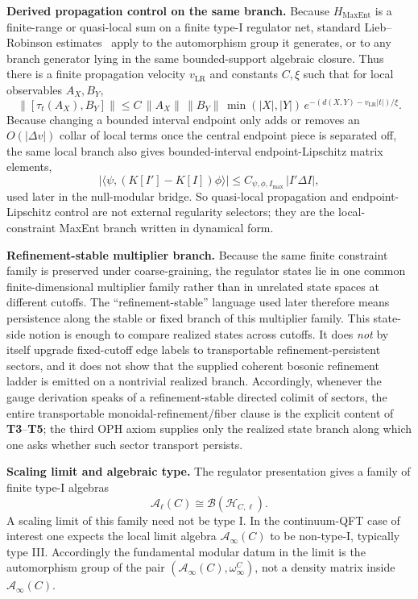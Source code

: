 \textbf{Derived propagation control on the same branch.} Because \(H_{\mathrm{MaxEnt}}\) is a finite-range or quasi-local sum on a finite type-I regulator net, standard Lieb--Robinson estimates~\cite{liebRobinson72} apply to the automorphism group it generates, or to any branch generator lying in the same bounded-support algebraic closure. Thus there is a finite propagation velocity \(v_{\mathrm{LR}}\) and constants \(C,\xi\) such that for local observables \(A_X,B_Y\),
\[
\bigl\|[\tau_t(A_X),B_Y]\bigr\|
\le
C\,\|A_X\|\,\|B_Y\|\,\min(|X|,|Y|)\,
e^{-(d(X,Y)-v_{\mathrm{LR}}|t|)/\xi}.
\]
Because changing a bounded interval endpoint only adds or removes an \(O(|\Delta v|)\) collar of local terms once the central endpoint piece is separated off, the same local branch also gives bounded-interval endpoint-Lipschitz matrix elements,
\[
\left|\langle\psi,(K[I']-K[I])\phi\rangle\right|
\le
C_{\psi,\phi,I_{\max}}\,|I'\Delta I|,
\]
used later in the null-modular bridge. So quasi-local propagation and endpoint-Lipschitz control are not external regularity selectors; they are the local-constraint MaxEnt branch written in dynamical form.

\textbf{Refinement-stable multiplier branch.} Because the same finite constraint family is preserved under coarse-graining, the regulator states lie in one common finite-dimensional multiplier family rather than in unrelated state spaces at different cutoffs. The ``refinement-stable'' language used later therefore means persistence along the stable or fixed branch of this multiplier family. This state-side notion is enough to compare realized states across cutoffs. It does \emph{not} by itself upgrade fixed-cutoff edge labels to transportable refinement-persistent sectors, and it does not show that the supplied coherent bosonic refinement ladder is emitted on a nontrivial realized branch. Accordingly, whenever the gauge derivation speaks of a refinement-stable directed colimit of sectors, the entire transportable monoidal-refinement/fiber clause is the explicit content of \textbf{T3}--\textbf{T5}; the third OPH axiom supplies only the realized state branch along which one asks whether such sector transport persists.

\textbf{Scaling limit and algebraic type.} The regulator presentation gives a family of finite type-I algebras
\[
\mathcal A_{\ell}(C)\cong \mathcal B(\mathcal H_{C,\ell}).
\]
A scaling limit of this family need not be type I. In the continuum-QFT case of interest one expects the local limit algebra \(\mathcal A_\infty(C)\) to be non-type-I, typically type III. Accordingly the fundamental modular datum in the limit is the automorphism group of the pair \((\mathcal A_\infty(C),\omega_\infty^C)\), not a density matrix inside \(\mathcal A_\infty(C)\).

